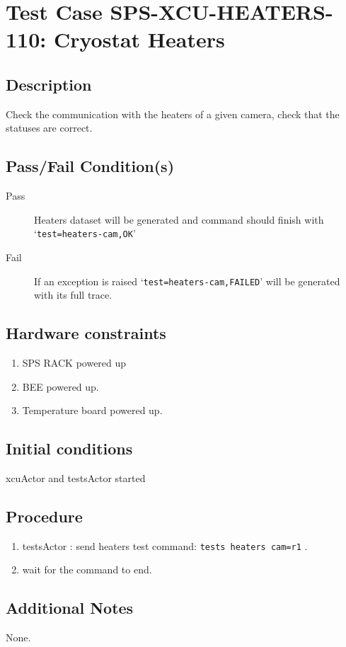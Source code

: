 \section{Test Case SPS-XCU-HEATERS-110: Cryostat Heaters}

\subsection{Description}

Check the communication with the heaters of a given camera, check that the statuses are correct.

\subsection{Pass/Fail Condition(s)}

\begin{description}
\item [Pass] Heaters dataset will be generated and command should finish with `\texttt{test=heaters-cam,OK}'
\item [Fail] If an exception is raised `\texttt{test=heaters-cam,FAILED}' will be generated with its full trace.

\end{description}

\subsection{Hardware constraints}

\begin{enumerate}
    \item SPS RACK powered up
    \item BEE powered up.
    \item Temperature board powered up.
\end{enumerate}

\subsection{Initial conditions}

xcuActor and testsActor started

\subsection{Procedure}

\begin{enumerate}
    \item testsActor : send heaters test command: \texttt{tests heaters cam=r1} .
    \item wait for the command to end.
\end{enumerate}

\subsection{Additional Notes}
None.
